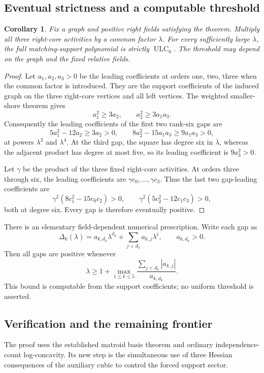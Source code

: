 \documentclass[11pt,a4paper]{article}
\newtheorem{corollary}[theorem]{Corollary}
\theoremstyle{remark}\newtheorem{remark}[theorem]{Remark}
\newcommand{\ULC}{\operatorname{ULC}}      %
\begin{document}
\subsection{Eventual strictness and a computable threshold}
\begin{corollary}\label{mrn:e:cc:cor:scaling}
Fix a graph and positive right fields satisfying the theorem. Multiply all three right-core activities by a common factor $\lambda$. For every sufficiently large $\lambda$, the full matching-support polynomial is strictly $\ULC_6$. The threshold may depend on the graph and the fixed relative fields.
\end{corollary}
\begin{proof}
Let $a_1,a_2,a_3>0$ be the leading coefficients at orders one, two, three when the common factor is introduced. They are the support coefficients of the induced graph on the three right-core vertices and all left vertices. The weighted smaller-shore theorem gives
\[
 a_1^2\ge3a_2,\qquad a_2^2\ge3a_1a_3.
\]
Consequently the leading coefficients of the first two rank-six gaps are
\[
 5a_1^2-12a_2\ge3a_2>0,\qquad
 8a_2^2-15a_1a_3\ge9a_1a_3>0,
\]
at powers $\lambda^2$ and $\lambda^4$. At the third gap, the square has degree six in $\lambda$, whereas the adjacent product has degree at most five, so its leading coefficient is $9a_3^2>0$.

Let $\gamma$ be the product of the three fixed right-core activities. At orders three through six, the leading coefficients are $\gamma c_0,\ldots,\gamma c_3$. Thus the last two gap-leading coefficients are
\[
 \gamma^2(8c_1^2-15c_0c_2)>0,\qquad
 \gamma^2(5c_2^2-12c_1c_3)>0,
\]
both at degree six. Every gap is therefore eventually positive.
\end{proof}

There is an elementary field-dependent numerical prescription. Write each gap as
\[
 \Delta_k(\lambda)=a_{k,d_k}\lambda^{d_k}
                 +\sum_{j<d_k}a_{k,j}\lambda^j,
 \qquad a_{k,d_k}>0.
\]
Then all gaps are positive whenever
\[
 \lambda\ge1+\max_{1\le k\le5}
     \frac{\sum_{j<d_k}|a_{k,j}|}{a_{k,d_k}}.
\]
This bound is computable from the support coefficients; no uniform threshold is asserted.

\subsection{Verification and the remaining frontier}
The proof uses the established matroid basis theorem and ordinary independence-count log-concavity. Its new step is the simultaneous use of three Hessian consequences of the auxiliary cubic to control the forced support sector.
\end{document}
